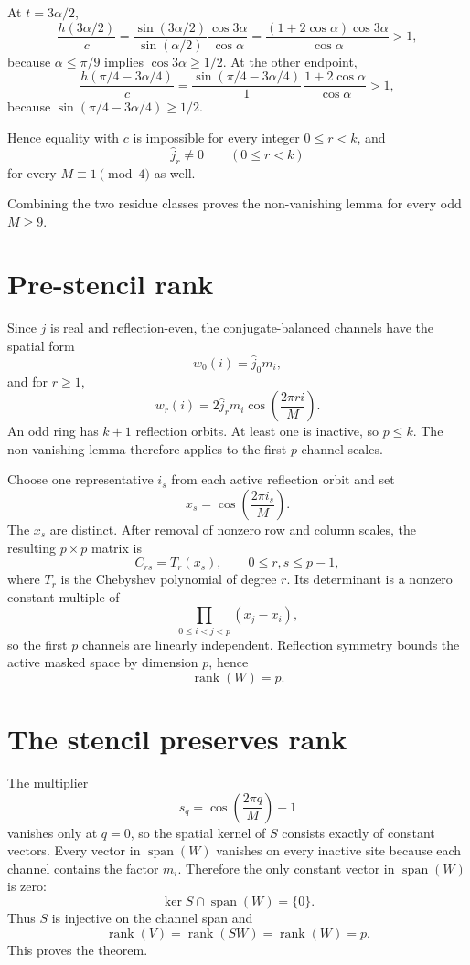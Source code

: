 \documentclass[11pt]{article}
\begin{document}
At $t=3\alpha/2$,
\[
\frac{h(3\alpha/2)}{c}
=\frac{\sin(3\alpha/2)}{\sin(\alpha/2)}\frac{\cos3\alpha}{\cos\alpha}
=\frac{(1+2\cos\alpha)\cos3\alpha}{\cos\alpha}>1,
\]
because $\alpha\le\pi/9$ implies $\cos3\alpha\ge1/2$. At the other endpoint,
\[
\frac{h(\pi/4-3\alpha/4)}{c}
=\frac{\sin(\pi/4-3\alpha/4)}{1}\,
\frac{1+2\cos\alpha}{\cos\alpha}>1,
\]
because $\sin(\pi/4-3\alpha/4)\ge1/2$.

Hence equality with $c$ is impossible for every integer $0\le r<k$, and
\[
\boxed{\widehat j_r\ne0\qquad(0\le r<k)}
\]
for every $M\equiv1\pmod4$ as well.

Combining the two residue classes proves the non-vanishing lemma for every odd $M\ge9$.

\section{Pre-stencil rank}
Since $j$ is real and reflection-even, the conjugate-balanced channels have the spatial form
\[
w_0(i)=\widehat j_0m_i,
\]
and for $r\ge1$,
\[
w_r(i)=2\widehat j_r m_i\cos\!\left(\frac{2\pi r i}{M}\right).
\]
An odd ring has $k+1$ reflection orbits. At least one is inactive, so $p\le k$. The non-vanishing lemma therefore applies to the first $p$ channel scales.

Choose one representative $i_s$ from each active reflection orbit and set
\[
x_s=\cos\!\left(\frac{2\pi i_s}{M}\right).
\]
The $x_s$ are distinct. After removal of nonzero row and column scales, the resulting $p\times p$ matrix is
\[
C_{rs}=T_r(x_s),\qquad 0\le r,s\le p-1,
\]
where $T_r$ is the Chebyshev polynomial of degree $r$. Its determinant is a nonzero constant multiple of
\[
\prod_{0\le i<j<p}(x_j-x_i),
\]
so the first $p$ channels are linearly independent. Reflection symmetry bounds the active masked space by dimension $p$, hence
\[
\boxed{\operatorname{rank}(W)=p.}
\]

\section{The stencil preserves rank}
The multiplier
\[
s_q=\cos\!\left(\frac{2\pi q}{M}\right)-1
\]
vanishes only at $q=0$, so the spatial kernel of $S$ consists exactly of constant vectors. Every vector in $\operatorname{span}(W)$ vanishes on every inactive site because each channel contains the factor $m_i$. Therefore the only constant vector in $\operatorname{span}(W)$ is zero:
\[
\ker S\cap\operatorname{span}(W)=\{0\}.
\]
Thus $S$ is injective on the channel span and
\[
\boxed{\operatorname{rank}(V)=\operatorname{rank}(SW)=\operatorname{rank}(W)=p.}
\]
This proves the theorem.
\end{document}
